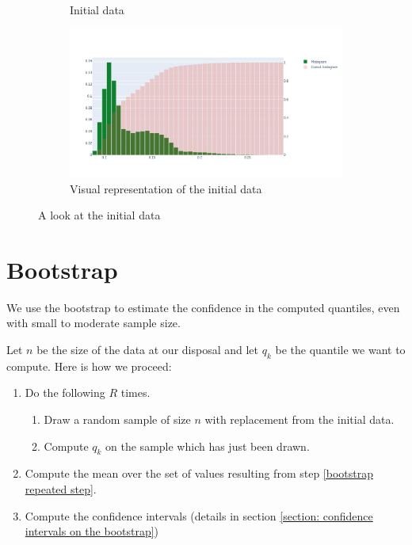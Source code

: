 \documentclass{article}
\begin{document}
\begin{figure}[H]
\begin{subfigure}{.25\textwidth}
        \caption{Initial data}
        \label{fig: initial data}
    \end{subfigure}
    \hfill
    \begin{subfigure}{.74\textwidth}
        \centering
        \includegraphics[width=\textwidth]{images/plot_excel_data.png}
        \caption{Visual representation of the initial data}
        \label{fig: visual representation of the initial data}
    \end{subfigure}
    \caption{A look at the initial data}
\end{figure}

\section{Bootstrap}
\label{section: bootstrap}
We use the bootstrap to estimate the confidence in the computed quantiles, even with small to moderate sample size.

Let \(n\) be the size of the data at our disposal and let \(q_k\) be the quantile we want to compute. Here is how we proceed:
\begin{enumerate}
    \item Do the following \(R\) times.
          \begin{enumerate}
              \item Draw a random sample of size \(n\) with replacement from the initial data.
              \item Compute \(q_k\) on the sample which has just been drawn. \label{bootstrap repeated step}
          \end{enumerate}
    \item Compute the mean over the set of values resulting from step \ref{bootstrap repeated step}.
    \item Compute the confidence intervals (details in section \ref{section: confidence intervals on the bootstrap})
\end{enumerate}
\end{document}
